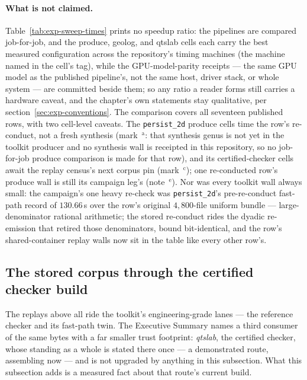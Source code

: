 \paragraph{What is not claimed.} Table~\ref{tab:exp-sweep-times}
prints no speedup ratio: the pipelines are compared job-for-job, and
the produce, geolog, and qtslab cells each carry the best measured
configuration across the repository's timing machines (the machine
named in the cell's tag), while the GPU-model-parity receipts --- the
same GPU model as the published pipeline's, not the same host, driver
stack, or whole system --- are committed beside them;
so any ratio a reader forms still carries a hardware caveat, and the
chapter's own statements stay qualitative, per
section~\ref{sec:exp-conventions}. The comparison covers all seventeen
published rows, with two cell-level caveats. The \texttt{persist\_2d}
produce cells time the row's re-conduct, not a fresh synthesis
(mark~$^{\text{a}}$: that synthesis genus is not yet in the toolkit
producer and no synthesis wall is receipted in this repository, so no
job-for-job produce comparison is made for that row), and its
certified-checker cells await the replay census's next corpus pin
(mark~$^{\text{c}}$); one re-conducted row's produce wall is still its
campaign leg's (note~$^{\text{e}}$). Nor was every toolkit wall always
small: the campaign's one heavy re-check was \texttt{persist\_2d}'s
pre-re-conduct fast-path record of $130.66$\,s over the row's original
$4{,}800$-file uniform bundle --- large-denominator rational
arithmetic; the stored re-conduct rides the dyadic re-emission that
retired those denominators, bound bit-identical, and the row's
shared-container replay walls now sit in the table like every other
row's.

\subsection{The stored corpus through the certified checker build}
\label{sec:exp-certified-checker}

The replays above all ride the toolkit's engineering-grade lanes ---
the reference checker and its fast-path twin. The Executive Summary
names a third consumer of the same bytes with a far smaller trust
footprint: \emph{qtslab}, the certified checker, whose standing as a
whole is stated there once --- a demonstrated route, assembling now
--- and is not upgraded by anything in this subsection. What this
subsection adds is a measured fact about that route's current build.

